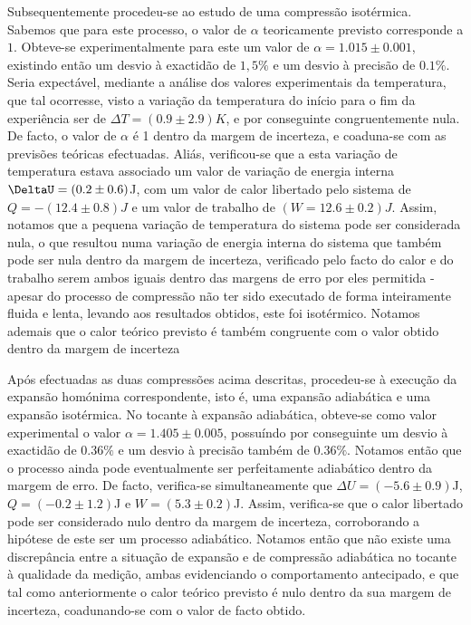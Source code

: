 \documentclass[9pt]{extarticle}
\begin{document}
\begin{multicols}{2}
\par Subsequentemente procedeu-se ao estudo de uma compressão isotérmica. Sabemos que para este processo, o valor de $\alpha$ teoricamente previsto corresponde a $1$. Obteve-se experimentalmente para este um valor de $\alpha=1.015\pm0.001$, existindo então um desvio à exactidão de $1,5\%$ e um desvio à precisão de $0.1\%$. Seria expectável, mediante a análise dos valores experimentais da temperatura, que tal ocorresse, visto a variação da temperatura do início para o fim da experiência ser de $\Delta T=(0.9\pm2.9)K$, e por conseguinte congruentemente nula. De facto, o valor de $\alpha$ é 1 dentro da margem de incerteza, e coaduna-se com as previsões teóricas efectuadas. Aliás, verificou-se que a esta variação de temperatura estava associado um valor de variação de energia interna $\DeltaU=(0.2\pm0.6)$J, com um valor de calor libertado pelo sistema de $Q=-(12.4\pm0.8)J$ e um valor de trabalho de $(W=12.6\pm0.2)J$. Assim, notamos que a pequena variação de temperatura do sistema pode ser considerada nula, o que resultou numa variação de energia interna do sistema que também pode ser nula dentro da margem de incerteza, verificado pelo facto do calor e do trabalho serem ambos iguais dentro das margens de erro por eles permitida  - apesar do processo de compressão não ter sido executado de forma inteiramente fluida e lenta, levando aos resultados obtidos, este foi isotérmico. Notamos ademais que o calor teórico previsto é também congruente com o valor obtido dentro da margem de incerteza

\par Após efectuadas as duas compressões acima descritas, procedeu-se à execução da expansão homónima correspondente, isto é, uma expansão adiabática e uma expansão isotérmica. No tocante à expansão adiabática, obteve-se como valor experimental o valor $\alpha=1.405\pm0.005$, possuíndo por conseguinte um desvio à exactidão de $0.36\%$ e um desvio à precisão também de $0.36\%$. Notamos então que o processo ainda pode eventualmente ser perfeitamente adiabático dentro da margem de erro. De facto, verifica-se simultaneamente que $\Delta U=(-5.6\pm0.9)$J, $Q=(-0.2\pm1.2)$J e $W=(5.3\pm0.2)$J. Assim, verifica-se que o calor libertado pode ser considerado nulo dentro da margem de incerteza, corroborando a hipótese de este ser um processo adiabático. Notamos então que não existe uma discrepância entre a situação de expansão e de compressão adiabática no tocante à qualidade da medição, ambas evidenciando o comportamento antecipado, e que tal como anteriormente o calor teórico previsto é nulo dentro da sua margem de incerteza, coadunando-se com o valor de facto obtido.


\end{multicols}
\end{document}
